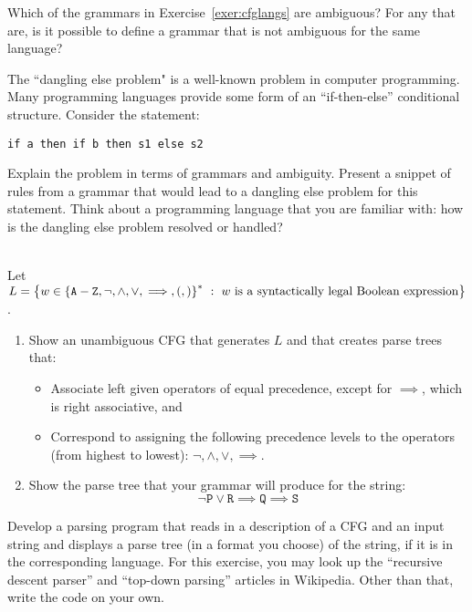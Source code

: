 \documentclass[twoside,letterpaper,openany]{book}
\begin{document}


\begin{exer1}
Which of the grammars in Exercise~\ref{exer:cfglangs} are ambiguous? For any that are, is it possible to define a  grammar that is not ambiguous for the same language?
\end{exer1}

\begin{exer2}
The ``dangling else problem" is a well-known problem in computer programming. Many programming languages provide some form of an ``if-then-else'' conditional structure.  Consider the statement:
\begin{verbatim}
if a then if b then s1 else s2
\end{verbatim}
Explain the problem in terms of grammars and ambiguity. Present a snippet of rules from a grammar that would lead to a dangling else problem for this statement. Think about a programming language that you are familiar with: how is the dangling else problem resolved or handled?
\end{exer2}

\begin{exer2}\label{exer:cfgbools}
~\\Let  $L = \left\lbrace w \in \left\lbrace \texttt{A} - \texttt{Z}, \neg, \wedge, \vee, \implies, \left(, \right) \right\rbrace^{*}\ :\ w~\textrm{is a syntactically legal Boolean expression} \right\rbrace$.
\begin{enumerate}
\item Show an unambiguous CFG that generates $L$ and that creates parse trees that:
\begin{itemize}
\item Associate left given operators of equal precedence, except for $\implies$, which is right associative, and
\item Correspond to assigning the following precedence levels to the operators (from highest to lowest): $\neg, \wedge, \vee, \implies$.
\end{itemize}
\item Show the parse tree that your grammar will produce for the string:
\[ \neg\texttt{P}\vee\texttt{R}\implies\texttt{Q}\implies\texttt{S} \]
\end{enumerate}
\end{exer2}

\begin{progexer}\happymac
Develop a parsing program that reads in a description of a CFG and an input string and displays a parse tree (in a format you choose) of the string, if it is in the corresponding language. For this exercise, you may look up the ``recursive descent parser'' and ``top-down parsing'' articles in Wikipedia. Other than that, write the code on your own.
\end{progexer}
\end{document}
